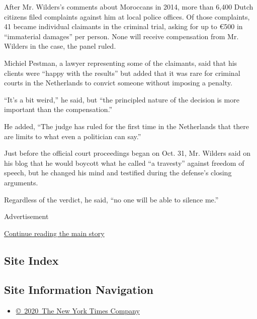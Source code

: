After Mr. Wilders's comments about Moroccans in 2014, more than 6,400
Dutch citizens filed complaints against him at local police offices. Of
those complaints, 41 became individual claimants in the criminal trial,
asking for up to €500 in ``immaterial damages'' per person. None will
receive compensation from Mr. Wilders in the case, the panel ruled.

Michiel Pestman, a lawyer representing some of the claimants, said that
his clients were ``happy with the results'' but added that it was rare
for criminal courts in the Netherlands to convict someone without
imposing a penalty.

``It's a bit weird,'' he said, but ``the principled nature of the
decision is more important than the compensation.''

He added, ``The judge has ruled for the first time in the Netherlands
that there are limits to what even a politician can say.''

Just before the official court proceedings began on Oct. 31, Mr. Wilders
said on his blog that he would boycott what he called ``a travesty''
against freedom of speech, but he changed his mind and testified during
the defense's closing arguments.

Regardless of the verdict, he said, ``no one will be able to silence
me.''

Advertisement

\protect\hyperlink{after-bottom}{Continue reading the main story}

\hypertarget{site-index}{%
\subsection{Site Index}\label{site-index}}

\hypertarget{site-information-navigation}{%
\subsection{Site Information
Navigation}\label{site-information-navigation}}

\begin{itemize}
\tightlist
\item
  \href{https://help.nytimes.com/hc/en-us/articles/115014792127-Copyright-notice}{©~2020~The
  New York Times Company}
\end{itemize}

